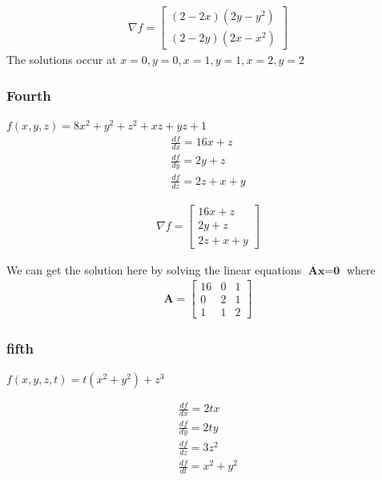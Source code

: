\documentclass[11pt]{article}
\begin{document}
\begin{align}
  \nabla f = 
  \begin{bmatrix}
     (2 - 2x)(2y - y^2) \\ (2 - 2y)(2x - x^2)
  \end{bmatrix}
\end{align}
The solutions occur at $x=0,y=0,x=1,y=1, x=2,y=2$

\subsubsection{Fourth}
$f(x,y,z) = 8x^2 + y^2 + z^2 + xz + yz + 1$
\begin{gather}
    \frac{d f}{d x} = 16x + z \\
    \frac{d f}{d y} = 2y + z \\
    \frac{d f}{d z} = 2z + x + y  
\end{gather}

\begin{align}
  \nabla f = 
  \begin{bmatrix}
     16x + z \\ 2y + z \\ 2z + x + y
  \end{bmatrix}
\end{align}

We can get the solution here by solving the linear equations $\textbf{A} \textbf{x} = \textbf{0}$
where 
\begin{align}
  \textbf{A} = 
  \begin{bmatrix}
     16 & 0 & 1 \\
     0 & 2 & 1 \\
     1 & 1 & 2
  \end{bmatrix}
\end{align}


\subsubsection{fifth}
$f(x,y,z,t) = t(x^2 + y^2) + z^3$

\begin{gather}
    \frac{d f}{d x} = 2tx \\
    \frac{d f}{d y} = 2ty \\
    \frac{d f}{d z} = 3z^2 \\
    \frac{d f}{d t} =  x^2 + y^2
\end{gather}
\end{document}
